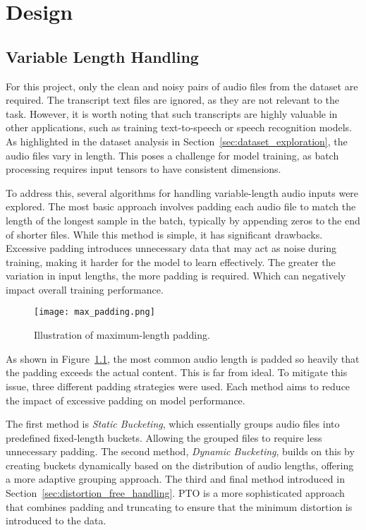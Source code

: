 \graphicspath{{content/chapters/5_design/figures/}}
\chapter{Design}
\label{chp:design}

\section{Variable Length Handling}
\label{sec:variable_length_handling}

For this project, only the clean and noisy pairs of audio files from the dataset are required. The transcript text files are ignored, as they are not relevant to the task. However, it is worth noting that such transcripts are highly valuable in other applications, such as training text-to-speech or speech recognition models. As highlighted in the dataset analysis in Section~\ref{sec:dataset_exploration}, the audio files vary in length. This poses a challenge for model training, as batch processing requires input tensors to have consistent dimensions.

To address this, several algorithms for handling variable-length audio inputs were explored. The most basic approach involves padding each audio file to match the length of the longest sample in the batch, typically by appending zeros to the end of shorter files. While this method is simple, it has significant drawbacks. Excessive padding introduces unnecessary data that may act as noise during training, making it harder for the model to learn effectively. The greater the variation in input lengths, the more padding is required. Which can negatively impact overall training performance.

\begin{figure}[h]
    \centering
    \texttt{[image: max\_padding.png]}
    \caption{\label{fig:max_padding}Illustration of maximum-length padding.}
\end{figure}

As shown in Figure~\ref{fig:max_padding}, the most common audio length is padded so heavily that the padding exceeds the actual content. This is far from ideal. To mitigate this issue, three different padding strategies were used. Each method aims to reduce the impact of excessive padding on model performance.

The first method is \textit{Static Bucketing}, which essentially groups audio files into predefined fixed-length buckets. Allowing the grouped files to require less unnecessary padding. The second method, \textit{Dynamic Bucketing}, builds on this by creating buckets dynamically based on the distribution of audio lengths, offering a more adaptive grouping approach. The third and final method introduced in Section~\ref{sec:distortion_free_handling}. PTO is a more sophisticated approach that combines padding and truncating to ensure that the minimum distortion is introduced to the data.

